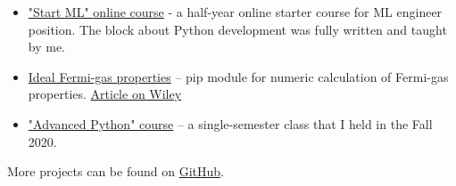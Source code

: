 \begin{itemize}
    \item \href{https://karpov.courses/ml-start}{"Start ML" online course} - a half-year online starter course for ML engineer position. The block about Python development was fully written and taught by me.
    \item \href{https://github.com/alekseik1/ifg-py}{Ideal Fermi-gas properties} -- pip module for numeric calculation of Fermi-gas properties. \href{http://dx.doi.org/10.1002/ctpp.202100139}{Article on Wiley}
    \item \href{https://github.com/alekseik1/advanced_python_1sem_2020}{"Advanced Python" course} -- a single-semester class that I held in the Fall 2020.
\end{itemize}
More projects can be found on \href{https://github.com/alekseik1/}{GitHub}.
